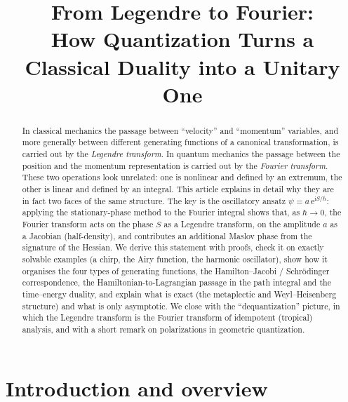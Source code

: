 \documentclass[11pt,a4paper]{article}
\title{From Legendre to Fourier:\\[2pt]
How Quantization Turns a Classical Duality into a Unitary One}
\author{}
\date{}
\newcommand{\ii}{\mathrm{i}}
\newcommand{\ee}{\mathrm{e}}
\newcommand{\hb}{\hbar}
\theoremstyle{plain}
\theoremstyle{definition}
\theoremstyle{remark}
\begin{document}
\maketitle

\begin{abstract}
In classical mechanics the passage between ``velocity'' and ``momentum'' variables, and more generally between different generating functions of a canonical transformation, is carried out by the \emph{Legendre transform}. In quantum mechanics the passage between the position and the momentum representation is carried out by the \emph{Fourier transform}. These two operations look unrelated: one is nonlinear and defined by an extremum, the other is linear and defined by an integral. This article explains in detail why they are in fact two faces of the same structure. The key is the oscillatory ansatz $\psi=a\,\ee^{\ii S/\hb}$: applying the stationary-phase method to the Fourier integral shows that, as $\hb\to0$, the Fourier transform acts on the phase $S$ as a Legendre transform, on the amplitude $a$ as a Jacobian (half-density), and contributes an additional Maslov phase from the signature of the Hessian. We derive this statement with proofs, check it on exactly solvable examples (a chirp, the Airy function, the harmonic oscillator), show how it organises the four types of generating functions, the Hamilton--Jacobi / Schr\"odinger correspondence, the Hamiltonian-to-Lagrangian passage in the path integral and the time--energy duality, and explain what is exact (the metaplectic and Weyl--Heisenberg structure) and what is only asymptotic. We close with the ``dequantization'' picture, in which the Legendre transform is the Fourier transform of idempotent (tropical) analysis, and with a short remark on polarizations in geometric quantization.
\end{abstract}

\tableofcontents

\section{Introduction and overview}
\end{document}
